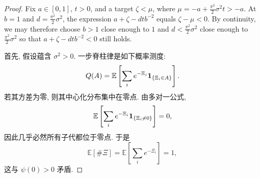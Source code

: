 \begin{proof}
{        Fix $a\in[0,1]$, $t>0$, and a target
        $\zeta<\mu$, where $\mu=-a+\frac{\pi^2}2\sigma^2t>-a$.
        At $b=1$ and $d=\frac{\pi^2}{2}\sigma^2$, the expression
        $a+\zeta-dtb^{-2}$ equals $\zeta-\mu<0$. By continuity, we may
        therefore choose $b>1$ close enough to $1$ and
        $d<\frac{\pi^2}{2}\sigma^2$ close enough to
        $\frac{\pi^2}{2}\sigma^2$ so that
        $a+\zeta-dtb^{-2}<0$ still holds.
    }{
        首先, 假设蕴含 $\sigma^2>0$. 一步脊柱律是如下概率测度:
        \[
            Q(A)=\mathbb E\left[\sum_i e^{-\Xi_i}{\bf1}_{\{\Xi_i\in A\}}\right].
        \]
        若其方差为零, 则其中心化分布集中在零点. 由多对一公式,
        \[
            \mathbb E\left[\sum_i e^{-\Xi_i}{\bf1}_{\{\Xi_i\ne0\}}\right]=0,
        \]
        因此几乎必然所有子代都位于零点. 于是
        \[
            \mathbb E[\#\Xi]=\mathbb E\left[\sum_i e^{-\Xi_i}\right]=1,
        \]
        这与 $\psi(0)>0$ 矛盾.

}
\end{proof}
